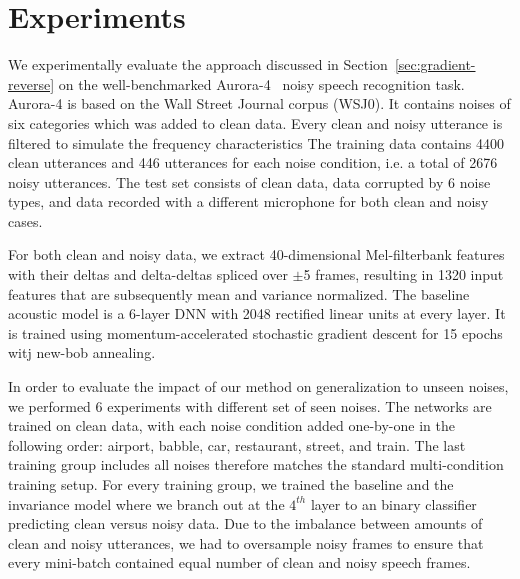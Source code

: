 \documentclass{article}
\begin{document}

\section{Experiments}
\label{sec:experiments}
We experimentally evaluate the approach discussed in Section~\ref{sec:gradient-reverse} 
on the well-benchmarked Aurora-4~\cite{parihar2002aurora} noisy speech recognition task. Aurora-4
is based on the Wall Street Journal corpus (WSJ0). It contains noises of 
six categories which was added to clean data. Every clean and noisy utterance is filtered to simulate the frequency characteristics %
%
The training
data  contains 4400 clean utterances and 446 utterances for each noise condition,
i.e. a total of 2676 noisy utterances.
The test set consists of clean data, data corrupted by 6 noise types, and data recorded with a different microphone for both clean and noisy cases.

For both clean and noisy data, we extract 40-dimensional Mel-filterbank features with their deltas and 
delta-deltas spliced over $\pm$5 frames, resulting in 1320 input 
features that are subsequently mean and variance normalized.  The baseline acoustic model is a  6-layer 
DNN with 2048 rectified linear units at every layer. It is trained using momentum-accelerated stochastic gradient descent for 15 epochs witj new-bob annealing.


In order to evaluate the impact of our method on generalization to unseen noises,
we performed 6 experiments with different set of seen noises. The networks are trained
on clean data, with each noise condition added one-by-one in the following order: airport, babble, car, 
restaurant, street, and train. The last training group includes all noises therefore matches the
standard multi-condition training setup. For every training group, we trained the
baseline and the invariance model where we branch out at the $4^{th}$ layer to an  
binary classifier predicting clean versus noisy data. Due to the imbalance between amounts of clean and
noisy utterances, we had to oversample noisy frames to ensure that every mini-batch contained
equal number of clean and noisy speech frames.
\end{document}
